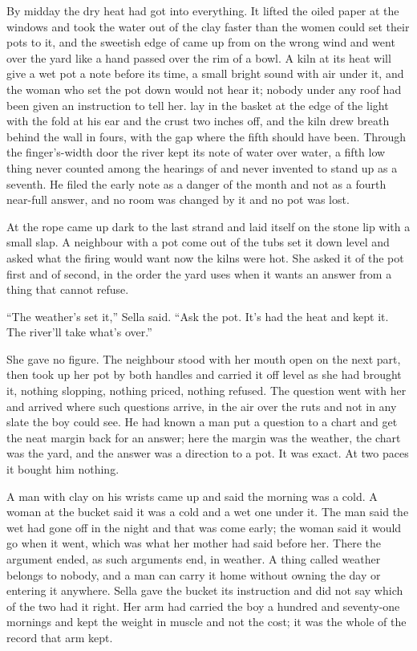 By midday the dry heat had got into everything. It lifted the oiled paper at the windows and took the water out of the clay faster than the women could set their pots to it, and the sweetish edge of  came up from  on the wrong wind and went over the yard like a hand passed over the rim of a bowl. A kiln at its heat will give a wet pot a note before its time, a small bright sound with air under it, and the woman who set the pot down would not hear it; nobody under any roof had been given an instruction to tell her.  lay in the basket at the edge of the light with the fold at his ear and the crust two inches off, and the kiln drew breath behind the wall in fours, with the gap where the fifth should have been. Through the finger's-width door the river kept its note of water over water, a fifth low thing never counted among the hearings of  and never invented to stand up as a seventh. He filed the early note as a danger of the month and not as a fourth near-full answer, and no room was changed by it and no pot was lost.

At  the rope came up dark to the last strand and laid itself on the stone lip with a small slap. A neighbour with a pot come out of the tubs set it down level and asked what the firing would want now the kilns were hot. She asked it of the pot first and of  second, in the order the yard uses when it wants an answer from a thing that cannot refuse.

“The weather's set it,” Sella said. “Ask the pot. It's had the heat and kept it. The river'll take what's over.”

She gave no figure. The neighbour stood with her mouth open on the next part, then took up her pot by both handles and carried it off level as she had brought it, nothing slopping, nothing priced, nothing refused. The question went with her and arrived where such questions arrive, in the air over the ruts and not in any slate the boy could see. He had known a man put a question to a chart and get the neat margin back for an answer; here the margin was the weather, the chart was the yard, and the answer was a direction to a pot. It was exact. At two paces it bought him nothing.

A man with clay on his wrists came up and said the morning was a cold. A woman at the bucket said it was a cold and a wet one under it. The man said the wet had gone off in the night and that was  come early; the woman said it would go when it went, which was what her mother had said before her. There the argument ended, as such arguments end, in weather. A thing called weather belongs to nobody, and a man can carry it home without owning the day or entering it anywhere. Sella gave the bucket its instruction and did not say which of the two had it right. Her arm had carried the boy a hundred and seventy-one mornings and kept the weight in muscle and not the cost; it was the whole of the record that arm kept.


